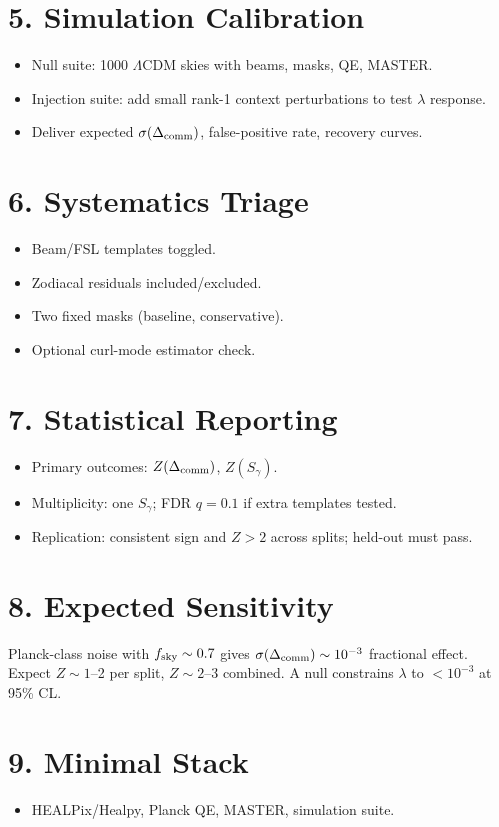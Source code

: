 \documentclass[11pt]{article}
\begin{document}
\section*{5. Simulation Calibration}
\begin{itemize}
\item Null suite: 1000 $\Lambda$CDM skies with beams, masks, QE, MASTER.
\item Injection suite: add small rank-1 context perturbations to test $\lambda$ response.
\item Deliver expected $\sigma(\Delta_{\rm comm})$, false-positive rate, recovery curves.
\end{itemize}

\section*{6. Systematics Triage}
\begin{itemize}
\item Beam/FSL templates toggled.
\item Zodiacal residuals included/excluded.
\item Two fixed masks (baseline, conservative).
\item Optional curl-mode estimator check.
\end{itemize}

\section*{7. Statistical Reporting}
\begin{itemize}
\item Primary outcomes: $Z(\Delta_{\rm comm})$, $Z(S_\gamma)$.
\item Multiplicity: one $S_\gamma$; FDR $q=0.1$ if extra templates tested.
\item Replication: consistent sign and $Z>2$ across splits; held-out must pass.
\end{itemize}

\section*{8. Expected Sensitivity}
Planck-class noise with $f_{\rm sky}\sim 0.7$ gives $\sigma(\Delta_{\rm comm}) \sim 10^{-3}$ fractional effect. Expect $Z \sim 1$--2 per split, $Z \sim 2$--3 combined. A null constrains $\lambda$ to $<10^{-3}$ at 95\% CL.

\section*{9. Minimal Stack}
\begin{itemize}
\item HEALPix/Healpy, Planck QE, MASTER, simulation suite.
\end{itemize}
\end{document}
